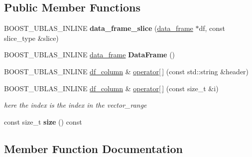 \subsection*{Public Member Functions}
\begin{DoxyCompactItemize}
\item 
B\+O\+O\+S\+T\+\_\+\+U\+B\+L\+A\+S\+\_\+\+I\+N\+L\+I\+NE {\bfseries data\+\_\+frame\+\_\+slice} (\hyperlink{classboost_1_1numeric_1_1ublas_1_1data__frame}{data\+\_\+frame} $\ast$df, const slice\+\_\+type \&slice)\hypertarget{classboost_1_1numeric_1_1ublas_1_1data__frame__slice_a4f440936f399c24489b37b2104f7a768}{}\label{classboost_1_1numeric_1_1ublas_1_1data__frame__slice_a4f440936f399c24489b37b2104f7a768}

\item 
B\+O\+O\+S\+T\+\_\+\+U\+B\+L\+A\+S\+\_\+\+I\+N\+L\+I\+NE \hyperlink{classboost_1_1numeric_1_1ublas_1_1data__frame}{data\+\_\+frame} {\bfseries Data\+Frame} ()\hypertarget{classboost_1_1numeric_1_1ublas_1_1data__frame__slice_a8daaa1c0828185701ca1bbddfe29af03}{}\label{classboost_1_1numeric_1_1ublas_1_1data__frame__slice_a8daaa1c0828185701ca1bbddfe29af03}

\item 
B\+O\+O\+S\+T\+\_\+\+U\+B\+L\+A\+S\+\_\+\+I\+N\+L\+I\+NE \hyperlink{classboost_1_1numeric_1_1ublas_1_1df__column}{df\+\_\+column} \& \hyperlink{classboost_1_1numeric_1_1ublas_1_1data__frame__slice_a575f53947d4aa935ec63035df39ca19a}{operator\mbox{[}$\,$\mbox{]}} (const std\+::string \&header)
\item 
B\+O\+O\+S\+T\+\_\+\+U\+B\+L\+A\+S\+\_\+\+I\+N\+L\+I\+NE \hyperlink{classboost_1_1numeric_1_1ublas_1_1df__column}{df\+\_\+column} \& \hyperlink{classboost_1_1numeric_1_1ublas_1_1data__frame__slice_a9df845f93d29e0707e39eb94ccc27b57}{operator\mbox{[}$\,$\mbox{]}} (const size\+\_\+t \&i)
\begin{DoxyCompactList}\small\item\em here the index is the index in the vector\+\_\+range \end{DoxyCompactList}\item 
const size\+\_\+t {\bfseries size} () const \hypertarget{classboost_1_1numeric_1_1ublas_1_1data__frame__slice_a289daad9e1aea8be05cead76fc5624e4}{}\label{classboost_1_1numeric_1_1ublas_1_1data__frame__slice_a289daad9e1aea8be05cead76fc5624e4}

\end{DoxyCompactItemize}


\subsection{Member Function Documentation}
